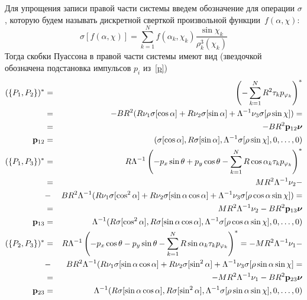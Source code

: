 Для упрощения записи правой части системы введем обозначение для операции $\sigma$, которую будем называть дискретной сверткой произвольной функции~$f(\alpha, \chi)$:
$$
\sigma[f(\alpha,\chi)] = \sum\limits_{k=1}^{N} f(\alpha_k,\chi_k) \frac{\sin\chi_k}{\rho_k^3(\chi_k)}
$$
Тогда скобки Пуассона в правой части системы имеют вид (звездочкой обозначена подстановка импульсов $p_i$ из~\ref{p})
\begin{eqnarray*}
    (\{P_1,P_2\})^* &=& \left(-\sum\limits_{k=1}^{N} R^2\tau_kp_{\varphi_k}\right)^* \\
                    &=& -BR^2(R\nu_1 \sigma[\cos\alpha] + R\nu_2 \sigma[\sin\alpha] + \Lambda^{-1}\nu_3\sigma[\rho\sin\chi]) = \\
                    &=& -BR^2\mathbf{p}_{12}\boldsymbol{\mathbf{\nu}}\\
    \mathbf{p}_{12}      &=& (\sigma[\cos\alpha], R\sigma[\sin\alpha], \Lambda^{-1}\sigma[\rho\sin\chi], 0,\dots,0) \\
    (\{P_1,P_3\})^* &=& {R}{\Lambda}^{-1}\left(-p_x\sin\theta + p_y\cos\theta - \sum\limits_{k=1}^{N} R\cos\alpha_k\tau_kp_{\varphi_k}\right)^* \\
                    &=& {MR^2}{\Lambda}^{-1}\nu_2 - \\
                    &-& {BR^2}{\Lambda}^{-1}(R\nu_1 \sigma[\cos^2\alpha] + R\nu_2 \sigma[\sin\alpha\cos\alpha] + 
                        \Lambda^{-1}\nu_3\sigma[\rho\cos\alpha\sin\chi]) = \\
                    &=& {MR^2}{\Lambda}^{-1}\nu_2-{BR^2} \mathbf{p}_{13}\boldsymbol{\mathbf{\nu}} \\
    \mathbf{p}_{13}      &=& \Lambda^{-1} (R\sigma[\cos^2\alpha], R\sigma[\sin\alpha\cos\alpha], \Lambda^{-1}\sigma[\rho\cos\alpha\sin\chi], 0,\dots,0) \\
    (\{P_2,P_3\})^* &=& {R}{\Lambda}^{-1}\left(-p_x\cos\theta - p_y\sin\theta - \sum\limits_{k=1}^{N} R\sin\alpha_k\tau_kp_{\varphi_k}\right)^* =    
                        -{MR^2}{\Lambda}^{-1}\nu_1 - \\
                    &-& {BR^2}{\Lambda}^{-1}(R\nu_1\sigma[\sin\alpha\cos\alpha] + R\nu_2\sigma[\sin^2\alpha]
                        + \Lambda^{-1}\nu_3\sigma[\rho\sin\alpha\sin\chi] = \\
                    &=& -{MR^2}{\Lambda}^{-1}\nu_1 -{BR^2}\mathbf{p}_{23}\boldsymbol{\mathbf{\nu}}\\
    \mathbf{p}_{23}      &=& \Lambda^{-1}(R\sigma[\sin\alpha\cos\alpha], R\sigma[\sin^2\alpha], \Lambda^{-1}\sigma[\rho\sin\alpha\sin\chi], 0,\dots,0)
\end{eqnarray*}

